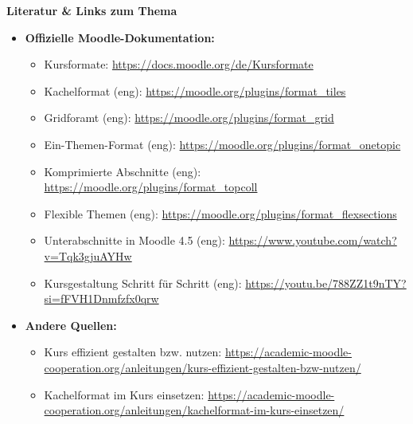 \documentclass{article}
\newlength{\commonwidth}
\begin{document}
\begin{center}
\begin{minipage}{\commonwidth}
\begin{mdframed}[
    backgroundcolor=lightgray, 
    linewidth=0pt, 
    roundcorner=5pt,
    innerleftmargin=1em,
    innerrightmargin=1em,
    innertopmargin=0.7em,
    innerbottommargin=0.7em
]
\raggedright %
\textbf{\textcolor{customred}{Literatur \& Links zum Thema}}
\vspace{0.2cm}
\begin{itemize}
\item \textbf{Offizielle Moodle-Dokumentation:}
\vspace{0.2cm}
  \begin{itemize}
  \item Kursformate: \url{https://docs.moodle.org/de/Kursformate}
  \item Kachelformat (eng): \url{https://moodle.org/plugins/format_tiles}
  \item Gridforamt (eng): \url{https://moodle.org/plugins/format_grid}
  \item Ein-Themen-Format (eng): \url{https://moodle.org/plugins/format_onetopic}
  \item Komprimierte Abschnitte (eng): \url{https://moodle.org/plugins/format_topcoll}
  \item Flexible Themen (eng): \url{https://moodle.org/plugins/format_flexsections}
  \item Unterabschnitte in Moodle 4.5 (eng): \url{https://www.youtube.com/watch?v=Tqk3gjuAYHw}
  \item Kursgestaltung Schritt für Schritt (eng): \url{https://youtu.be/788ZZ1t9nTY?si=fFVH1Dnmfzfx0qrw}
  \end{itemize}
\vspace{0.5cm}
\item \textbf{Andere Quellen:}
\vspace{0.2cm}
  \begin{itemize}
  \item Kurs effizient gestalten bzw. nutzen: \url{https://academic-moodle-cooperation.org/anleitungen/kurs-effizient-gestalten-bzw-nutzen/}
  \item Kachelformat im Kurs einsetzen: \url{https://academic-moodle-cooperation.org/anleitungen/kachelformat-im-kurs-einsetzen/}
  \end{itemize}
\end{itemize}
\end{mdframed}
\end{minipage}
\end{center}
\end{document}
